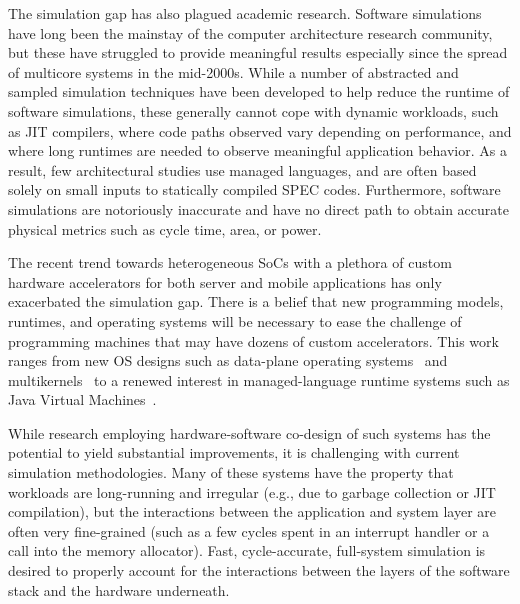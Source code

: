 The simulation gap has also plagued academic research. Software simulations
have long been the mainstay of the computer architecture research community,
but these have struggled to provide meaningful results especially since the
spread of multicore systems in the mid-2000s.  While a number of abstracted and
sampled simulation techniques have been developed to help reduce the runtime of
software simulations, these generally cannot cope with dynamic workloads, such
as JIT compilers, where code paths observed vary depending on performance, and
where long runtimes are needed to observe meaningful application behavior.  As
a result, few architectural studies use managed languages, and are often based
solely on small inputs to statically compiled SPEC codes.  Furthermore,
software simulations are notoriously inaccurate and have no direct path to
obtain accurate physical metrics such as cycle time, area, or power.

The recent trend towards heterogeneous SoCs with a plethora of custom hardware
accelerators for both server and mobile applications has only exacerbated the
simulation gap. There is a belief that new programming models, runtimes, and
operating systems will be necessary to ease the challenge of programming
machines that may have dozens of custom accelerators. This work ranges from new
OS designs such as data-plane operating systems~\cite{arrakis} and
multikernels~\cite{barrelfish} to a renewed interest in managed-language
runtime systems such as Java Virtual Machines~\cite{broom,taurus}.

While research employing hardware-software co-design of such systems has the
potential to yield substantial improvements, it is challenging with current
simulation methodologies.  Many of these systems have the property that
workloads are long-running and irregular (e.g., due to garbage collection or
JIT compilation), but the interactions between the application and system layer
are often very fine-grained (such as a few cycles spent in an interrupt handler
or a call into the memory allocator).  Fast, cycle-accurate, full-system
simulation is desired to properly account for the interactions between the
layers of the software stack and the hardware underneath.

